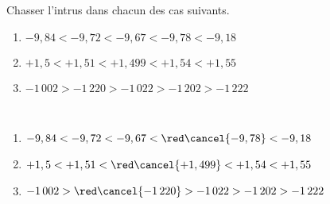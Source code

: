 \begin{exercice}
    Chasser l'intrus dans chacun des cas suivants.
    {\baselineskip=7mm
    \begin{enumerate}
       \item $-9,84 < -9,72 < -9,67 < -9,78 < -9,18$
       \item $+1,5 < +1,51 < +1,499 < +1,54 < +1,55$
       \item $-1\,002 > -1\,220 > -1\,022 > -1\,202 > -1\,222$
    \end{enumerate}}
 \end{exercice}
 
 \begin{corrige}
    \ \\ [-7mm]
    {\baselineskip=7mm
    \begin{enumerate}
       \item $-9,84 < -9,72 < -9,67 < {\red\cancel{-9,78}} < -9,18$ 
       \item $+1,5 < +1,51 < {\red\cancel{+1,499}} < +1,54 < +1,55$ 
       \item $-1\,002 > {\red\cancel{-1\,220}} > -1\,022 > -1\,202 > -1\,222$
    \end{enumerate}}
 \end{corrige}